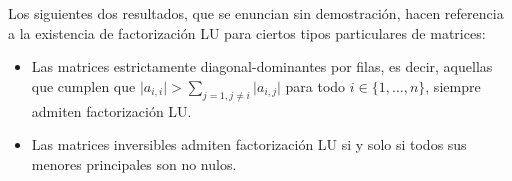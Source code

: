 Los siguientes dos resultados, que se enuncian sin demostración, hacen
referencia a la existencia de factorización LU para ciertos tipos particulares
de matrices:
\begin{itemize}
\item Las matrices estrictamente diagonal-dominantes por filas, es decir,
    aquellas que cumplen que $\vert a_{i,i} \vert > \sum_{j=1, j \neq i}
    \vert a_{i,j}\vert$ para todo $i \in \{1,\dots,n\}$, siempre admiten
    factorización LU.
\item Las matrices inversibles admiten factorización LU si y solo si todos
    sus menores principales son no nulos.
\end{itemize}
